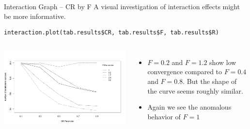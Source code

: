 \begin{frame}[t,fragile]{Interaction Graph -- CR by F}{}
  A visual investigation of interaction effects might be more informative.
\begin{verbatim}
interaction.plot(tab.results$CR, tab.results$F, tab.results$R)
\end{verbatim}

  \begin{columns}
    \includegraphics[width=\textwidth]{../img/interaction_DE_CRbyF.png}
    
    \begin{itemize}
    \item $F=0.2$ and $F=1.2$ show low convergence compared to $F=0.4$
      and $F=0.8$. But the shape of the curve seems roughly similar.
    \item Again we see the anomalous behavior of $F=1$
    \end{itemize}
  \end{columns}
\end{frame}

